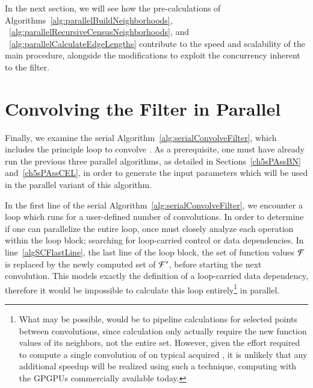 In the next section, we will see how the pre-calculations of Algorithms~\ref{alg:parallelBuildNeighborhoods}, ~\ref{alg:parallelRecursiveCensusNeighborhoods}, and ~\ref{alg:parallelCalculateEdgeLengths} contribute to the speed and scalability of the main procedure, alongside the modifications to exploit the concurrency inherent to the filter.

%
%
%
%
\section{Convolving the Filter in Parallel}
\label{ch6sCF}
Finally, we examine the serial Algorithm~\ref{alg:serialConvolveFilter}, which includes the principle loop to convolve . As a prerequisite, one must have already run the previous three parallel algorithms, as detailed in Sections~\ref{ch5sPAssBN} and~\ref{ch5sPAssCEL}, in order to generate the input parameters which will be used in the parallel variant of this algorithm.

In the first line of the serial Algorithm~\ref{alg:serialConvolveFilter}, we encounter a loop which runs for a user-defined number of convolutions. In order to determine if one can parallelize the entire loop, once must closely analyze each operation within the loop block; searching for loop-carried control or data dependencies. In line~\ref{algSCFlastLine}, the last line of the loop block, the set of function values $\mathcal{F}$ is replaced by the newly computed set of  $\mathcal{F}'$, before starting the next convolution. This models exactly the definition of a loop-carried data dependency, therefore it would be impossible to calculate this loop entirely\footnote{What may be possible, would be to pipeline calculations for selected points between convolutions, since calculation only actually require the new function values of its neighbors, not the entire set. However, given the effort required to compute a single convolution of  on typical acquired \tdd{}, it is unlikely that any additional speedup will be realized using such a technique, computing with the GPGPUs commercially available today.} in parallel.


